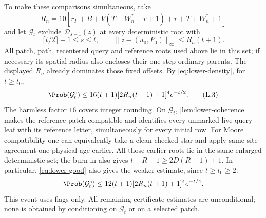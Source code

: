 To make these comparisons simultaneous, take
\[
 R_n=10[r_F+B+V(T+W_n^*+r+1)+r+T+W_n^*+1]
\]
and let $\mathcal G_t$ exclude $\mathcal D_{s-1}(z)$ at every deterministic root with
\[
 \lceil t/2\rceil+1\le s\le t,\qquad
 \|z-(u_0,P_0)\|_\infty\le R_n(t+1).
\]
All patch, path, recentered query and reference roots used above lie in this set; if necessary its spatial radius also encloses their one-step ordinary parents. The displayed $R_n$ already dominates those fixed offsets. By \eqref{eq:lower-density}, for $t\ge t_0$,
\[
 \Prob(\mathcal G_t^c)\le
 16(t+1)[2R_n(t+1)+1]^4e^{-t/2}.                  \tag{L.3}\label{eq:lower-good}
\]
The harmless factor $16$ covers integer rounding. On $\mathcal G_t$, \cref{lem:lower-coherence} makes the reference patch compatible and identifies every unmarked live query leaf with its reference letter, simultaneously for every initial row. For Moore compatibility one can equivalently take a clean checked star and apply same-site agreement one physical age earlier. All those earlier roots lie in the same enlarged deterministic set; the burn-in also gives $t-R-1\ge2D(R+1)+1$. In particular, \eqref{eq:lower-good} also gives the weaker estimate, since $t\ge t_0\ge2$:
\[
 \Prob(\mathcal G_t^c)\le12(t+1)[2R_n(t+1)+1]^4e^{-t/4}.
\]
This event uses flags only. All remaining certificate estimates are unconditional; none is obtained by conditioning on $\mathcal G_t$ or on a selected patch.

